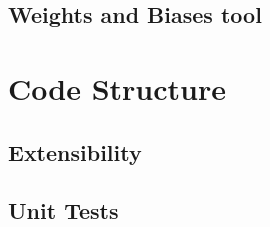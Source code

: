 \subsection{Weights and Biases tool}


\section{Code Structure}


\subsection{Extensibility}


\subsection{Unit Tests}

